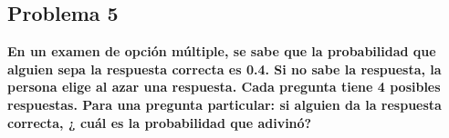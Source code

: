 \subsection*{Problema 5}
\textbf{En un examen de opción múltiple, se sabe que la probabilidad que alguien sepa la respuesta correcta es 0.4. Si no sabe la respuesta, la persona elige al azar una respuesta. Cada pregunta tiene 4 posibles respuestas. Para una pregunta particular: si alguien da la respuesta correcta, ¿ cuál es la probabilidad que adivinó?}
